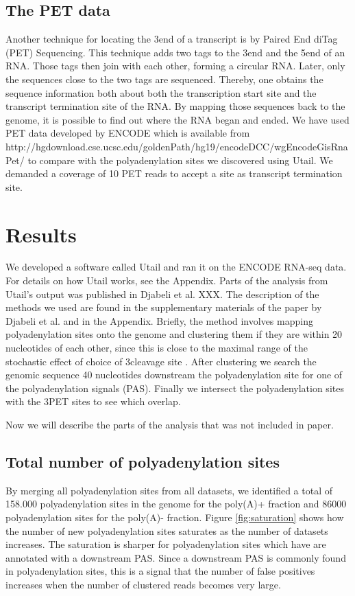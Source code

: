 \subsection{The PET data}
Another technique for locating the 3\p end of a transcript is by Paired End
diTag (PET) Sequencing. This technique adds two tags to the 3\p end and the
5\p end of an RNA. Those tags then join with each other, forming a circular
RNA. Later, only the sequences close to the two tags are sequenced. Thereby,
one obtains the sequence information both about both the transcription start
site and the transcript termination site of the RNA. By mapping those sequences
back to the genome, it is possible to find out where the RNA began and ended.
We have used PET data developed by ENCODE which is available from
http://hgdownload.cse.ucsc.edu/goldenPath/hg19/encodeDCC/wgEncodeGisRnaPet/ to
compare with the polyadenylation sites we discovered using Utail. We demanded a
coverage of 10 PET reads to accept a site as transcript termination site.

\section{Results}
We developed a software called Utail and ran it on the ENCODE RNA-seq data.
For details on how Utail works, see the Appendix. Parts of the analysis from
Utail's output was published in Djabeli et al. XXX. The description of the
methods we used are found in the supplementary materials of the paper by
Djabeli et al. and in the Appendix. Briefly, the method involves mapping
polyadenylation sites onto the genome and clustering them if they are within 20
nucleotides of each other, since this is close to the maximal range of the
stochastic effect of choice of 3\p cleavage site \cite{tian_large-scale_2005}.
After clustering we search the genomic sequence 40 nucleotides downstream the
polyadenylation site for one of the polyadenylation signals (PAS). Finally we
intersect the polyadenylation sites with the 3\p PET sites to see which
overlap.

Now we will describe the parts of the analysis that was not included in paper.

\subsection{Total number of polyadenylation sites}
By merging all polyadenylation sites from all datasets, we identified a total
of 158.000 polyadenylation sites in the genome for the poly(A)+ fraction and
86000 polyadenylation sites for the poly(A)- fraction. Figure
\ref{fig:saturation} shows how the number of new polyadenylation sites
saturates as the number of datasets increases. The saturation is sharper for
polyadenylation sites which have are annotated with a downstream PAS. Since a
downstream PAS is commonly found in polyadenylation sites, this is a signal
that the number of false positives increases when the number of clustered reads
becomes very large. 

